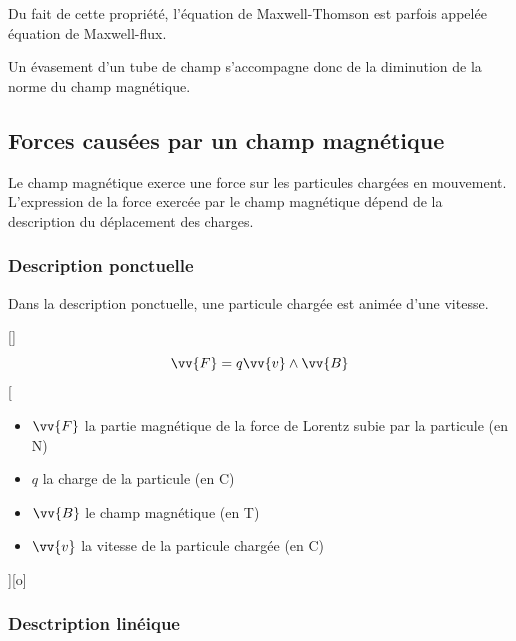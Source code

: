 Du fait de cette propriété, l'équation de Maxwell-Thomson est parfois appelée équation de Maxwell-flux.

Un évasement d'un tube de champ s'accompagne donc de la diminution de la norme du champ magnétique.


\subsection{Forces causées par un champ magnétique}

Le champ magnétique exerce une force sur les particules chargées en mouvement. L'expression de la force exercée par le champ magnétique dépend de la description du déplacement des charges.

\subsubsection{Description ponctuelle}

Dans la description ponctuelle, une particule chargée est animée d'une vitesse.

[]
{$$\vv{F}=q\vv{v}\wedge\vv{B}$$}
[
    \begin{itemize}
        \item $\vv{F}$ la partie magnétique de la force de Lorentz subie par la particule (en \unit{N})
        \item $q$ la charge de la particule (en \unit{C})
        \item $\vv{B}$ le champ magnétique (en \unit{T})
        \item $\vv{v}$ la vitesse de la particule chargée (en \unit{C})
    \end{itemize}
][o]



\subsubsection{Desctription linéique}

